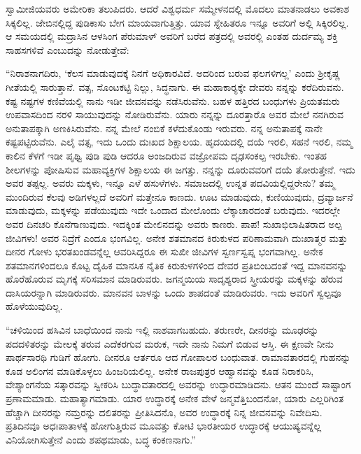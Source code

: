  ಸ್ವಾಮೀಜಿಯವರು ಅಮೇರಿಕಾ ತಲುಪಿದರು. ಆದರೆ ವಿಶ್ವಧರ್ಮ ಸಮ್ಮೇಳನದಲ್ಲಿ ಮೊದಲು ಮಾತನಾಡಲು ಅವಕಾಶ ಸಿಕ್ಕಲಿಲ್ಲ. ಜೇಬಿನಲ್ಲಿದ್ದ ಪುಡಿಕಾಸು ಬೇಗ ಮಾಯವಾಗುತ್ತಿತ್ತು. ಯಾವ ಸ್ನೇಹಿತರೂ ಇನ್ನೂ ಅವರಿಗೆ ಅಲ್ಲಿ ಸಿಕ್ಕಿರಲಿಲ್ಲ. ಆ ಸಮಯದಲ್ಲಿ ಮದ್ರಾಸಿನ ಆಳಸಿಂಗ ಪೆರುಮಾಳ್ ಅವರಿಗೆ ಬರೆದ ಪತ್ರದಲ್ಲಿ ಅವರಲ್ಲಿ ಎಂತಹ ದುರ್ದಮ್ಯ ಶಕ್ತಿ ಸಾಹಸಗಳಿವೆ ಎಂಬುದನ್ನು ನೋಡುತ್ತೇವೆ: 

 “ನಿರಾಶನಾಗದಿರು, ‘ಕೆಲಸ ಮಾಡುವುದಕ್ಕೆ ನಿನಗೆ ಅಧಿಕಾರವಿದೆ. ಅದರಿಂದ ಬರುವ ಫಲಗಳಿಗಲ್ಲ’ ಎಂದು ಶ‍್ರೀಕೃಷ್ಣ ಗೀತೆಯಲ್ಲಿ ಸಾರುತ್ತಾನೆ. ವತ್ಸ, ಸೊಂಟಕಟ್ಟಿ ನಿಲ್ಲು, ಸಿದ್ಧನಾಗು. ಈ ಮಹಾಕಾರ‍್ಯಕ್ಕೇ ದೇವರು ನನ್ನನ್ನು ಕರೆದಿರುವನು. ಕಷ್ಟ ನಷ್ಟಗಳ ಕಣಿವೆಯಲ್ಲಿ ನಾನು ಇಡೀ ಜೀವನವನ್ನು ನಡೆಸಿರುವೆನು. ಬಹಳ ಹತ್ತಿರದ ಬಂಧುಗಳು ಪ್ರಿಯತಮರು ಉಪವಾಸದಿಂದ ನರಳಿ ಸಾಯುವುದನ್ನು ನೋಡಿರುವೆನು. ಯಾರು ನನ್ನನ್ನು ದೂರತ್ತಾರೊ ಅವರ ಮೇಲೆ ನನಗಿರುವ ಅನುತಾಪಕ್ಕಾಗಿ ಅಣಕಿಸಿರುವೆನು. ನನ್ನ ಮೇಲೆ ನಂಬಿಕೆ ಕಳೆದುಕೊಂಡು ಇರುವರು. ನನ್ನ ಅನುತಾಪಕ್ಕೆ ನಾನೇ ಕಷ್ಟಪಟ್ಟಿರುವೆನು. ಎಲೈ ವತ್ಸ, ಇದು ಒಂದು ದುಃಖದ ಶಿಕ್ಷಾಲಯ. ಹೃದಯದಲ್ಲಿ ದಯೆ ಇರಲಿ, ಸಹನೆ ಇರಲಿ, ನಮ್ಮ ಕಾಲಿನ ಕೆಳಗೆ ಇಡೀ ಪೃಥ್ವಿ ಪುಡಿ ಪುಡಿ ಆದರೂ ಅಂಜದಿರುವ ವಜ್ರೋಪಮ ದೃಢಸಂಕಲ್ಪ ಇರಬೇಕು. ಇಂತಹ ಶೀಲಗಳನ್ನು ಪೋಷಿಸುವ ಮಹಾವ್ಯಕ್ತಿಗಳ ಶಿಕ್ಷಾಲಯ ಈ ಜಗತ್ತು. ನನ್ನನ್ನು ದೂರುವವರಿಗೆ ದಯೆ ತೋರುತ್ತೇನೆ. ಇದು ಅವರ ತಪ್ಪಲ್ಲ. ಅವರು ಮಕ್ಕಳು, ಇನ್ನೂ ಎಳೆ ಹಸುಳೆಗಳು. ಸಮಾಜದಲ್ಲಿ ಉನ್ನತ ಪದವಿಯಲ್ಲಿದ್ದರೇನು? ತಮ್ಮ ಮುಂದಿರುವ ಕೆಲವು ಅಡಿಗಳಲ್ಲದೆ ಅವರಿಗೆ ಮತ್ತೇನೂ ಕಾಣದು. ಊಟ ಮಾಡುವುದು, ಕುಣಿಯುವುದು, ದ್ರವ್ಯಾರ್ಜನೆ ಮಾಡುವುದು, ಮಕ್ಕಳನ್ನು ಪಡೆಯುವುದು ಇದೇ ಒಂದಾದ ಮೇಲೊಂದು ಲೆಕ್ಕಾಚಾರದಂತೆ ಬರುವುದು. ಇದರಲ್ಲೇ ಅವರ ದಿನಚರಿ ಕೊನೆಗಾಣುವುದು. ಇದಕ್ಕಿಂತ ಮೇಲಿನದನ್ನು ಅವರು ಕಾಣರು. ಪಾಪ! ಸುಖಾಭಿಲಾಷಿತರಾದ ಅಲ್ಪ ಜೀವಿಗಳು! ಅವರ ನಿದ್ರೆಗೆ ಎಂದೂ ಭಂಗವಿಲ್ಲ. ಅನೇಕ ಶತಮಾನದ ಕಿರುಕುಳದ ಪರಿಣಾಮವಾಗಿ ದುಃಖಾತ್ಮರ ಮತ್ತು ದೀನರ ಗೋಳು ಭರತಖಂಡವನ್ನೆಲ್ಲ ಆವರಿಸಿದ್ದರೂ ಈ ಸುಖೀ ಜೀವಿಗಳ ಸ್ವರ್ಣಸ್ವಪ್ನ ಭಂಗವಾಗಿಲ್ಲ. ಅನೇಕ ಶತಮಾನಗಳಿಂದಲೂ ಕೊಟ್ಟ ದೈಹಿಕ ಮಾನಸಿಕ ನೈತಿಕ ಕಿರುಕುಳಗಳಿಂದ ದೇವರ ಪ್ರತಿಬಿಂಬದಂತೆ ಇದ್ದ ಮಾನವನನ್ನು ಹೊರೆಹೊರುವ ಮೃಗಕ್ಕೆ ಸರಿಸಮಾನ ಮಾಡಿರುವರು. ಜಗನ್ಮಯಿಯ ಸಾದೃಶ್ಯರಾದ ಸ್ತ್ರೀಯರನ್ನು ಮಕ್ಕಳನ್ನು ಹೆರುವ ದಾಸಿಯರನ್ನಾಗಿ ಮಾಡಿರುವರು. ಮಾನವನ ಬಾಳನ್ನು ಒಂದು ಶಾಪದಂತೆ ಮಾಡಿರುವರು. ಇದು ಅವರಿಗೆ ಸ್ವಲ್ಪವೂ ಹೊಳೆಯುವುದಿಲ್ಲ. 

 “ಚಳಿಯಿಂದ ಹಸಿವಿನ ಬಾಧೆಯಿಂದ ನಾನು ಇಲ್ಲಿ ನಾಶವಾಗಬಹುದು. ತರುಣರೇ, ದೀನರನ್ನು ಮೂಢರನ್ನು ಪದದಳಿತರನ್ನು ಮೇಲಕ್ಕೆ ತರುವ ಎದೆಕರಗುವ ಮರುಕ, ಇದೇ ನಾನು ನಿಮಗೆ ಬಿಡುವ ಆಸ್ತಿ. ಈ ಕ್ಷಣವೇ ನೀನು ಪಾರ್ಥಸಾರಥಿ ಗುಡಿಗೆ ಹೋಗು. ದೀನರೂ ಆರ್ತರೂ ಆದ ಗೋಪಾಲರ ಬಂಧುವಾತ. ರಾಮಾವತಾರದಲ್ಲಿ ಗುಹನನ್ನು ಕೂಡ ಅಲಿಂಗನ ಮಾಡಿಕೊಳ್ಳಲು ಹಿಂಜರಿಯಲಿಲ್ಲ. ಅನೇಕ ರಾಜಪುತ್ರರ ಆಹ್ವಾನವನ್ನು ಕೂಡ ನಿರಾಕರಿಸಿ, ವೇಶ್ಯಾಂಗನೆಯ ಸತ್ಕಾರವನ್ನು ಸ್ವೀಕರಿಸಿ ಬುದ್ಧಾವತಾರದಲ್ಲಿ ಅವರನ್ನು ಉದ್ಧಾರಮಾಡಿದನು. ಆತನ ಮುಂದೆ ಸಾಷ್ಟಾಂಗ ಪ್ರಣಾಮಮಾಡು. ಮಹಾತ್ಯಾಗಮಾಡು. ಯಾರ ಉದ್ಧಾರಕ್ಕೆ ಅನೇಕ ವೇಳೆ ಜನ್ಮವೆತ್ತಿಬಂದನೋ, ಯಾರು ಎಲ್ಲರಿಗಿಂತ ಹೆಚ್ಚಾಗಿ ದೀನರನ್ನು ನಮ್ರರನ್ನು ದಲಿತರನ್ನು ಪ್ರೀತಿಸಿದನೊ, ಅವರ ಉದ್ಧಾರಕ್ಕೆ ನಿನ್ನ ಜೀವನವನ್ನು ನಿವೇದಿಸು. ಪ್ರತಿದಿನವೂ ಅಧಃಪಾತಾಳಕ್ಕೆ ಹೋಗುತ್ತಿರುವ ಮೂವತ್ತು ಕೋಟಿ ಭಾರತೀಯರ ಉದ್ಧಾರಕ್ಕೆ ಆಯುಷ್ಯವನ್ನೆಲ್ಲ ವಿನಿಯೋಗಿಸುತ್ತೇನೆ ಎಂದು ಶಪಥಮಾಡು, ಬದ್ಧ ಕಂಕಣನಾಗು.” 

